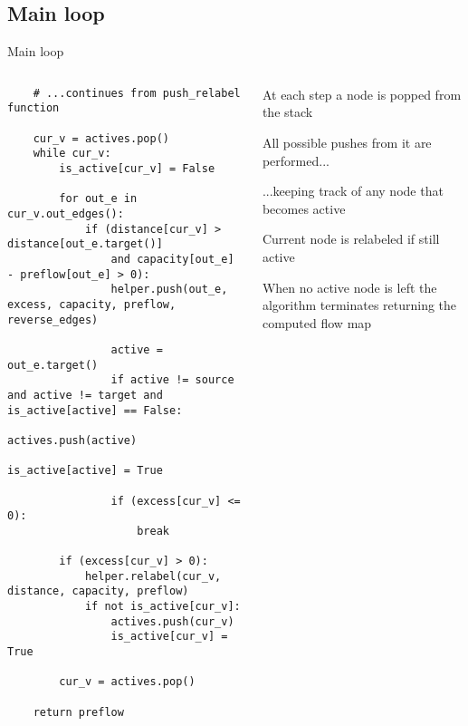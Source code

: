 \documentclass{beamer}
\begin{document}
\subsection{Main loop}
\begin{frame}[fragile]{Main loop}
    \begin{columns}[T]
        \begin{column}{0.50\textwidth}
            \begin{lstlisting}
    # ...continues from push_relabel function

    cur_v = actives.pop()
    while cur_v:
        is_active[cur_v] = False

        for out_e in cur_v.out_edges():
            if (distance[cur_v] > distance[out_e.target()]
                and capacity[out_e] - preflow[out_e] > 0):
                helper.push(out_e, excess, capacity, preflow, reverse_edges)

                active = out_e.target()
                if active != source and active != target and is_active[active] == False:
                    actives.push(active)
                    is_active[active] = True

                if (excess[cur_v] <= 0):
                    break

        if (excess[cur_v] > 0):
            helper.relabel(cur_v, distance, capacity, preflow)
            if not is_active[cur_v]:
                actives.push(cur_v)
                is_active[cur_v] = True

        cur_v = actives.pop()

    return preflow
            \end{lstlisting}
        \end{column}

        \begin{column}{0.70\textwidth}
            \begin{sidecomment}
                \pause
                \vskip 25bp
                At each step a node is popped from the stack

                \pause
                \vskip 10bp
                All possible pushes from it are performed...

                \pause
                \vskip 24bp
                ...keeping track of any node that becomes active

                \pause
                \vskip 43bp
                Current node is relabeled if still active

                \pause
                \vskip 33bp
                When no active node is left the algorithm terminates returning the computed flow map
            \end{sidecomment}
        \end{column}
    \end{columns}
\end{frame}
\end{document}

